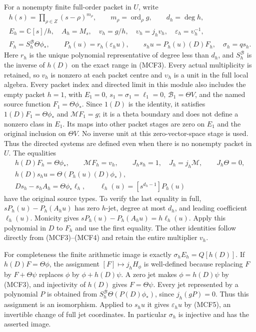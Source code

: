 For a nonempty finite full-order packet in $U$, write
\[
\begin{gathered}
h(s)=\prod_{\rho\in Z}(s-\rho)^{m_\rho},\qquad
m_\rho=\operatorname{ord}_\rho g,\qquad d_h=\deg h,\\
E_h=\mathbb C[s]/h,\quad A_h=M_s,\quad v_h=g/h,\quad
\upsilon_h=j_hv_h,\quad\varepsilon_h=\upsilon_h^{-1},\\
F_h=S_h^{\mathscr B}\Theta\phi_*,\qquad
P_h(u)=r_h(\varepsilon_hu),\qquad
s_hu=P_h(u)(D)F_h,\quad \sigma_h=qs_h.
\end{gathered}
\tag{MCF4}
\]
Here $r_h$ is the unique polynomial representative of degree less than
$d_h$, and $S_h^{\mathscr B}$ is the inverse of $h(D)$ on the exact range
in (MCF3).  Every actual multiplicity is retained, so $v_h$ is nonzero
at each packet centre and $\upsilon_h$ is a unit in the full local algebra.
Every packet index and directed limit in this module also includes the
empty packet $h=1$, with $E_1=0$, $s_1=\sigma_1=\ell_1=0$,
$\mathscr B_1=\Theta V$, and the named source function
$F_1=\Theta\phi_*$. Since $1(D)$ is the identity, it satisfies
$1(D)F_1=\Theta\phi_*$ and $\mathcal MF_1=g$; it is a theta
boundary and does not define a nonzero class in $E_1$.
Its maps into other packet stages are zero
on $E_1$ and the original inclusion on $\Theta V$.  No inverse unit
at this zero-vector-space stage is used.  Thus the directed systems
are defined even when there is no nonempty packet in $U$.
The equalities
\[
\begin{gathered}
h(D)F_h=\Theta\phi_*,\qquad \mathcal MF_h=v_h,\qquad
J_hs_h=1,\quad J_h=j_h\mathcal M,\qquad J_h\Theta=0,\\
h(D)s_hu=\Theta(P_h(u)(D)\phi_*),\\
Ds_h-s_hA_h=\Theta\phi_*\ell_h,\qquad
\ell_h(u)=[s^{d_h-1}]P_h(u)
\end{gathered}
\tag{MCF5}
\]
have the original source types.  To verify the last equality in full,
$sP_h(u)-P_h(A_hu)$ has zero $h$-jet, degree at most $d_h$, and leading
coefficient $\ell_h(u)$.  Monicity gives
$sP_h(u)-P_h(A_hu)=h\ell_h(u)$.  Apply this polynomial in $D$ to $F_h$
and use the first equality.  The other identities follow directly from
(MCF3)--(MCF4) and retain the entire multiplier $v_h$.

For completeness the finite arithmetic image is exactly
$\sigma_hE_h=Q[h(D)]$.  If $h(D)F=\Theta\phi$, the assignment
$[F]\mapsto j_hH_\phi$ is well-defined because replacing $F$ by
$F+\Theta\psi$ replaces $\phi$ by $\phi+h(D)\psi$.  A zero jet makes
$\phi=h(D)\psi$ by (MCF3), and injectivity of $h(D)$ gives
$F=\Theta\psi$.  Every jet represented by a polynomial $P$ is obtained
from $S_h^{\mathscr B}\Theta(P(D)\phi_*)$, since $j_h(gP)=0$.
Thus this assignment is an isomorphism.  Applied to $s_hu$ it gives
$\varepsilon_hu$ by (MCF5), an invertible change of full jet coordinates.
In particular $\sigma_h$ is injective and has the asserted image.

